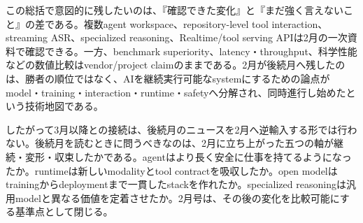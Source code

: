 この総括で意図的に残したいのは、『確認できた変化』と『まだ強く言えないこと』の差である。複数agent workspace、repository-level tool interaction、streaming ASR、specialized reasoning、Realtime/tool serving APIは2月の一次資料で確認できる。一方、benchmark superiority、latency・throughput、科学性能などの数値比較はvendor/project claimのままである。2月が後続月へ残したのは、勝者の順位ではなく、AIを継続実行可能なsystemにするための論点がmodel・training・interaction・runtime・safetyへ分解され、同時進行し始めたという技術地図である。\autocite{src-15823ae5556e,src-4a841ea7ec7c,src-5041feb6f87f,src-67307025f5d9,src-9aba7995b6a5,src-d8b7c1c36830,src-dd5d9b8662f3,src-dd64fe3084a4,src-eac8dfbeb78c}


したがって3月以降との接続は、後続月のニュースを2月へ逆輸入する形では行わない。後続月を読むときに問うべきなのは、2月に立ち上がった五つの軸が継続・変形・収束したかである。agentはより長く安全に仕事を持てるようになったか。runtimeは新しいmodalityとtool contractを吸収したか。open modelはtrainingからdeploymentまで一貫したstackを作れたか。specialized reasoningは汎用modelと異なる価値を定着させたか。2月号は、その後の変化を比較可能にする基準点として閉じる。\autocite{src-5041feb6f87f,src-67307025f5d9,src-9aba7995b6a5,src-d8b7c1c36830,src-dd5d9b8662f3,src-eac8dfbeb78c}
